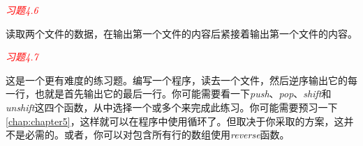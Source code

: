 \textcolor{red}{\textit{习题4.6}}
\begin{adjustwidth}{4em}{}
读取两个文件的数据，在输出第一个文件的内容后紧接着输出第一个文件的内容。
\end{adjustwidth}

\textcolor{red}{\textit{习题4.7}}
\begin{adjustwidth}{4em}{}
这是一个更有难度的练习题。编写一个程序，读去一个文件，然后逆序输出它的每一行，也就是首先输出它的最后一行。你可能需要看一下\textit{push}、\textit{pop}、\textit{shift}和\textit{unshift}这四个函数，从中选择一个或多个来完成此练习。你可能需要预习一下\autoref{chap:chapter5}，这样就可以在程序中使用循环了。但取决于你采取的方案，这并不是必需的。或者，你可以对包含所有行的数组使用\textit{reverse}函数。
\end{adjustwidth}


